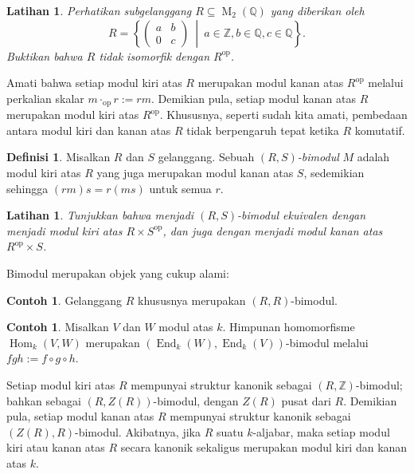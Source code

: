 \documentclass[12pt]{article}
\theoremstyle{plain}
\newtheorem{exercise}[theorem]{Latihan}
\theoremstyle{definition}
\newtheorem{definition}[theorem]{Definisi}
\newtheorem{example}[theorem]{Contoh}
\theoremstyle{remark}
\numberwithin{equation}{section}
\begin{document}
\begin{exercise}
Perhatikan subgelanggang $R \subseteq \operatorname{M}_2(\mathbb{Q})$
yang diberikan oleh
\[
R = \left\{ \begin{pmatrix} a & b\\ 0 & c \end{pmatrix}\ \middle|\
a \in \mathbb{Z}, b \in \mathbb{Q}, c \in \mathbb{Q} \right\}.
\]
Buktikan bahwa $R$ tidak isomorfik dengan $R^{\mathrm{op}}$.
\end{exercise}

Amati bahwa setiap modul kiri atas $R$ merupakan modul kanan atas $R^{\mathrm{op}}$
melalui perkalian skalar $m \cdot_{\mathrm{op}} r := rm$.
Demikian pula, setiap modul kanan atas $R$ merupakan modul kiri atas $R^{\mathrm{op}}$.
Khususnya, seperti sudah kita amati,
pembedaan antara modul kiri dan kanan
atas $R$ tidak berpengaruh tepat ketika $R$ komutatif.

\begin{definition}
Misalkan $R$ dan $S$ gelanggang. Sebuah \emph{$(R,S)$-bimodul} $M$ adalah modul
kiri atas $R$ yang juga merupakan modul kanan atas $S$, sedemikian sehingga $(rm)s=r(ms)$ untuk
semua $r$.
\end{definition}

\begin{exercise}
Tunjukkan bahwa menjadi $(R,S)$-bimodul ekuivalen dengan menjadi
modul kiri atas $R \times S^{\mathrm{op}}$, dan juga dengan menjadi
modul kanan atas $R^{\mathrm{op}} \times S$.
\end{exercise}

Bimodul merupakan objek yang cukup alami:

\begin{example}
Gelanggang $R$ khususnya merupakan $(R,R)$-bimodul.
\end{example}

\begin{example}
Misalkan $V$ dan $W$ modul atas $k$. Himpunan homomorfisme
$\operatorname{Hom}_k(V,W)$ merupakan
$(\operatorname{End}_k(W),\operatorname{End}_k(V))$-bimodul
melalui $fgh := f \circ g \circ h$.
\end{example}

Setiap modul kiri atas $R$ mempunyai struktur kanonik sebagai
$(R,\mathbb{Z})$-bimodul; bahkan sebagai $(R,Z(R))$-bimodul, dengan
$Z(R)$ pusat dari $R$.
Demikian pula, setiap modul kanan atas $R$ mempunyai struktur kanonik sebagai
$(Z(R),R)$-bimodul.
Akibatnya, jika $R$ suatu $k$-aljabar, maka setiap modul kiri atau kanan
atas $R$ secara kanonik sekaligus merupakan modul kiri dan kanan atas $k$.
\end{document}
